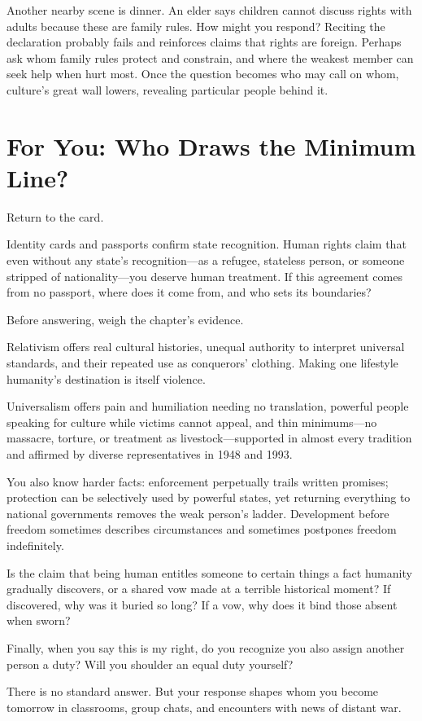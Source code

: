 Another nearby scene is dinner. An elder says children cannot discuss rights with adults because these are family rules. How might you respond? Reciting the declaration probably fails and reinforces claims that rights are foreign. Perhaps ask whom family rules protect and constrain, and where the weakest member can seek help when hurt most. Once the question becomes who may call on whom, culture's great wall lowers, revealing particular people behind it.

\section{For You: Who Draws the Minimum Line?}
Return to the card.

Identity cards and passports confirm state recognition. Human rights claim that even without any state's recognition---as a refugee, stateless person, or someone stripped of nationality---you deserve human treatment. If this agreement comes from no passport, where does it come from, and who sets its boundaries?

Before answering, weigh the chapter's evidence.

Relativism offers real cultural histories, unequal authority to interpret universal standards, and their repeated use as conquerors' clothing. Making one lifestyle humanity's destination is itself violence.

Universalism offers pain and humiliation needing no translation, powerful people speaking for culture while victims cannot appeal, and thin minimums---no massacre, torture, or treatment as livestock---supported in almost every tradition and affirmed by diverse representatives in 1948 and 1993.

You also know harder facts: enforcement perpetually trails written promises; protection can be selectively used by powerful states, yet returning everything to national governments removes the weak person's ladder. Development before freedom sometimes describes circumstances and sometimes postpones freedom indefinitely.

Is the claim that being human entitles someone to certain things a fact humanity gradually discovers, or a shared vow made at a terrible historical moment? If discovered, why was it buried so long? If a vow, why does it bind those absent when sworn?

Finally, when you say this is my right, do you recognize you also assign another person a duty? Will you shoulder an equal duty yourself?

There is no standard answer. But your response shapes whom you become tomorrow in classrooms, group chats, and encounters with news of distant war.
